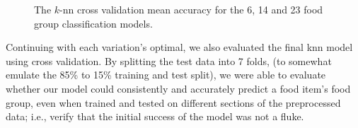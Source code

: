 \documentclass[11pt]{article}
\begin{document}
\begin{figure}[htbp]
    \centering
    \qquad
    \qquad
    \caption{The $k$-nn cross validation mean accuracy for the 6, 14 and 23 food group classification models.}
    \label{fig:knn-cross-validation}
\end{figure}

Continuing with each variation’s optimal, we also evaluated the final knn model using cross validation. By splitting the test data into 7 folds, (to somewhat emulate the 85\% to 15\% training and test split), we were able to evaluate whether our model could consistently and accurately predict a food item’s food group, even when trained and tested on different sections of the preprocessed data; i.e., verify that the initial success of the model was not a fluke.
\end{document}
